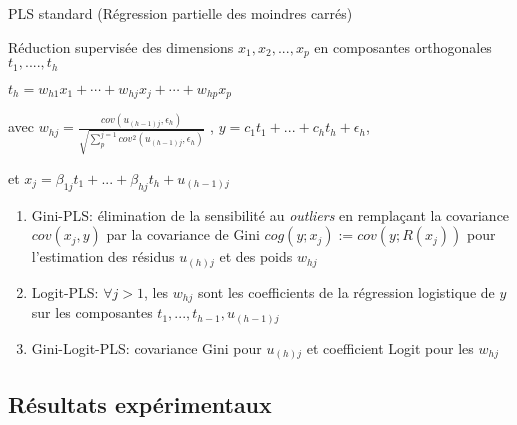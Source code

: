 \begin{frame}[t]{\mysubsectiontitle}
PLS standard (Régression partielle des moindres carrés) 

Réduction supervisée des dimensions $x_1, x_2, ..., x_p$ en composantes orthogonales $t_1, ...., t_h$

$t_h = w_{h1} x_1 + \cdots + w_{hj} x_j + \cdots + w_{hp} x_p$

avec $w_{hj} = \frac{cov(u_{(h-1)j}, \epsilon_h)}{\sqrt{\sum_p^{j=1} cov^2(u_{(h-1)j}, \epsilon_h)}}$
, $y=c_1 t_1 + ... + c_h t_h + \epsilon_h$,

et $x_j=\beta_{1j} t_1 + ... + \beta_{hj} t_h + u_{(h-1)j}$
\end{frame}

\begin{frame}[t]{\mysubsectiontitle}
\begin{enumerate}
\setlength\itemsep{1.5em}

\item Gini-PLS: 
élimination de la sensibilité au \textit{outliers} en remplaçant la covariance $cov(x_j, y)$ par la covariance de Gini $cog(y; x_j) := cov(y; R(x_j))$ pour l'estimation des résidus $u_{(h)j}$ et des poids $w_{hj}$ \cite{mussard2018ginipls}

\item Logit-PLS:  $\forall j > 1$, les $w_{hj} $ sont les coefficients de la régression logistique de $y$ sur les composantes $t_1, ..., t_{h-1}, u_{(h-1)j}$ \cite{tenenhaus2005logitpls}

\item Gini-Logit-PLS: covariance Gini pour $u_{(h)j}$ et coefficient Logit pour les $w_{hj}$
\end{enumerate}
\end{frame}


\subsection{Résultats expérimentaux}

